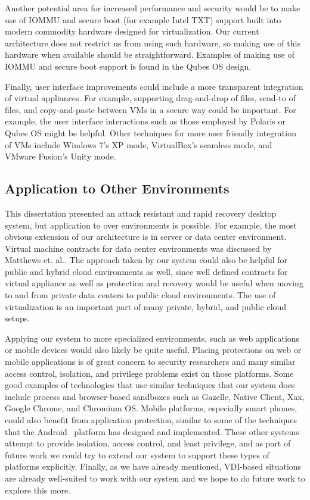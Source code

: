 Another potential area for increased performance and security would be to make use of IOMMU and secure boot (for example Intel TXT) support built into modern commodity hardware designed for virtualization. Our current architecture does not restrict us from using such hardware, so making use of this hardware when available should be straightforward. Examples of making use of IOMMU and secure boot support is found in the Qubes OS design. 

Finally, user interface improvements could include a more transparent integration of virtual appliances. For example, supporting drag-and-drop of files, send-to of files, and copy-and-paste between VMs in a secure way could be important. For example, the user interface interactions such as those employed by Polaris\cite{stiegler_2006} or Qubes OS might be helpful. Other techniques for more user friendly integration of VMs include Windows 7's XP mode, VirtualBox's seamless mode, and VMware Fusion's Unity mode.

\subsection{Application to Other Environments}
\label{sec:fw-other-environments}

This dissertation presented an attack resistant and rapid recovery desktop system, but application to over environments is possible. For example, the most obvious extension of our architecture is in server or data center environment. Virtual machine contracts for data center environments was discussed by Matthews et. al.\cite{virtual_machine_contract_ICAC09}. The approach taken by our system could also be helpful for public and hybrid cloud environments as well, since well defined contracts for virtual appliance as well as protection and recovery would be useful when moving to and from private data centers to public cloud environments. The use of virtualization is an important part of many private, hybrid, and public cloud setups.

Applying our system to more specialized environments, such as web applications or mobile devices would also likely be quite useful. Placing protections on web or mobile applications is of great concern to security researchers and many similar access control, isolation, and privilege problems exist on those platforms. Some good examples of technologies that use similar techniques that our system does include process and browser-based sandboxes such as Gazelle\cite{grier_gazelle_2009}, Native Client\cite{yee_nacl_2009}, Xax\cite{douceur_xax_2008}, Google Chrome\cite{reis_2009}, and Chromium OS\cite{chromium_os_security_overview_website}. Mobile platforms, especially smart phones, could also benefit from application protection, similar to some of the techniques that the Android~\cite{canning_android_keynote_2009,android_security_dev} platform has designed and implemented. These other systems attempt to provide isolation, access control, and least privilege, and as part of future work we could try to extend our system to support these types of platforms explicitly. Finally, as we have already mentioned, VDI-based situations are already well-suited to work with our system and we hope to do future work to explore this more.


